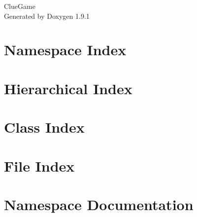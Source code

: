 \let\mypdfximage\pdfximage\def\pdfximage{\immediate\mypdfximage}\documentclass[twoside]{book}
\newcommand{\+}{\discretionary{\mbox{\scriptsize$\hookleftarrow$}}{}{}}
\newcommand{\clearemptydoublepage}{%
  \newpage{\pagestyle{empty}\cleardoublepage}%
}
\begin{document}
\raggedbottom

\hypersetup{pageanchor=false,
             bookmarksnumbered=true,
             pdfencoding=unicode
            }
\begin{titlepage}
\vspace*{7cm}
\begin{center}%
{\Large Clue\+Game }\\
\vspace*{1cm}
{\large Generated by Doxygen 1.9.1}\\
\end{center}
\end{titlepage}
\clearemptydoublepage
{}
\tableofcontents
\clearemptydoublepage
{}
\hypersetup{pageanchor=true}

\chapter{Namespace Index}

\chapter{Hierarchical Index}

\chapter{Class Index}

\chapter{File Index}

\chapter{Namespace Documentation}

\end{document}
